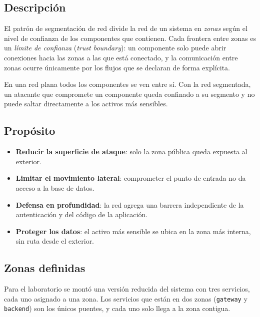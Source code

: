 \documentclass[11pt,letterpaper]{article}
\newcommand{\code}[1]{\texttt{#1}}
\begin{document}
\subsection{Descripción}

El patrón de segmentación de red divide la red de un sistema en \emph{zonas}
según el nivel de confianza de los componentes que contienen. Cada frontera entre
zonas es un \emph{límite de confianza} (\emph{trust boundary}): un componente solo
puede abrir conexiones hacia las zonas a las que está conectado, y la comunicación
entre zonas ocurre únicamente por los flujos que se declaran de forma explícita.

En una red plana todos los componentes se ven entre sí. Con la red segmentada, un
atacante que compromete un componente queda confinado a su segmento y no puede
saltar directamente a los activos más sensibles.

\subsection{Propósito}

\begin{itemize}
  \item \textbf{Reducir la superficie de ataque}: solo la zona pública queda expuesta al exterior.
  \item \textbf{Limitar el movimiento lateral}: comprometer el punto de entrada no da acceso a la base de datos.
  \item \textbf{Defensa en profundidad}: la red agrega una barrera independiente de la autenticación y del código de la aplicación.
  \item \textbf{Proteger los datos}: el activo más sensible se ubica en la zona más interna, sin ruta desde el exterior.
\end{itemize}

\subsection{Zonas definidas}

Para el laboratorio se montó una versión reducida del sistema con tres servicios,
cada uno asignado a una zona. Los servicios que están en dos zonas (\code{gateway}
y \code{backend}) son los únicos puentes, y cada uno solo llega a la zona contigua.
\end{document}
